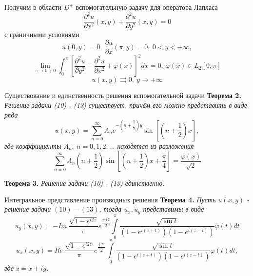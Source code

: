 \documentclass[10pt,pdf,hyperref={unicode}]{beamer}
\begin{document}
\begin{frame}
		Получим в области $D^{+}$ вспомогательную задачу для оператора Лапласа 
	\begin{equation}
		\dfrac{\partial^2 u}{\partial x^2}(x,y) + \dfrac{\partial^2 u}{\partial y^2}(x,y) = 0
	\end{equation}
	с граничными условиями 
	\begin{equation}
		u(0,y) = 0, \ \dfrac{\partial u}{\partial x}(\pi, y) = 0, \ 0 < y < +\infty, 
	\end{equation}
	\begin{equation}
		\lim\limits_{\varepsilon \to 0 + 0} \int_0^\pi \left[\dfrac{\partial ^2 u}{\partial y^2} - \dfrac{\partial^2 u}{\partial x^2} + \varphi(x) \right]^2 dx = 0, \ \varphi(x) \in L_2[0,\pi]
	\end{equation}
	\begin{equation}
		u(x,y) \rightrightarrows 0, \ y \to +\infty 
	\end{equation}
	
	
\end{frame}
\begin{frame}{Существование и единственность решения вспомогательной задачи}
	\textbf{Теорема 2.} \textit{	Решение задачи (10) - (13) существует, причём его можно представить в виде ряда
		\begin{equation}
			u(x,y) = \sum\limits_{n=0}^{\infty} A_n e^{-\left(n + \dfrac12\right)y} \sin{\left[\left(n + \dfrac12\right)x\right]},
		\end{equation}
		где коэффициенты $A_n, \ n =0,1,2, \dots$ находятся из разложения
		\begin{equation}
			\sum\limits_{n=0}^{\infty} A_n \left(n + \dfrac12 \right) \sin{\left[\left(n +\dfrac12\right)x + \dfrac\pi4\right]} = \dfrac{\varphi(x)}{\sqrt2}
	\end{equation}}
	
	\textbf{Теорема 3.} \textit{Решение задачи (10) - (13) единственно.}
\end{frame}
\begin{frame} {Интегральное представление производных решения}
	\textbf{Теорема 4.} \textit{	Пусть $u(x,y)$ - решение задачи $(10)-(13)$, тогда $u_x, u_y$ представимы в виде
		\begin{equation}
			u_y(x,y) = - Im\  \dfrac{ \sqrt{1 - e^{i2z}} }{\pi} e^{\dfrac{+iz}{2}} \int\limits_0^\pi  \dfrac{\sqrt{\sin{t}}}{\left(1 - e^{i(z+t)} \right) \left(1 - e^{i(z-t)}\right)}  \varphi(t) dt
		\end{equation}
		\begin{equation}
			u_x(x,y) = Re\   \dfrac{ \sqrt{1 - e^{i2z}} }{\pi} e^{\dfrac{+iz}{2}} \int\limits_0^\pi  \dfrac{\sqrt{\sin{t}}}{\left(1 - e^{i(z+t)} \right) \left(1 - e^{i(z-t)}\right)}  \varphi(t) dt,
	\end{equation}
	где $z = x + iy$.
}
	
\end{frame}
\end{document}
